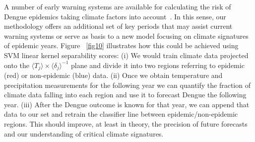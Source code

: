 \documentclass[final,leqno]{siamltexmm2}
\begin{document}
 


A number of early warning systems are available for calculating the risk of Dengue epidemics taking climate factors into 
account~\cite{Buczak2012,Buczak2014,Lowe2011,Lowe2012, Racloz2012, Johansson2016}. In this sense, our methodology offers an additional set of key periods
that may assist current warning systems or serve as basis to a new model focusing on climate signatures of epidemic years.  
Figure ~\ref{fig10} illustrates how this could be achieved using SVM linear kernel separability scores: (i) We would train climate 
data projected onto the $\langle T_j \rangle  \times  \langle \delta_j \rangle ^{-1}$ plane and divide it into two regions referring
to epidemic (red) or non-epidemic (blue) data. (ii) Once we obtain temperature and precipitation measurements for the following
year we can quantify the fraction of climate data falling into each region and use it to forecast Dengue the following year. 
(iii) After the Dengue outcome is known for that year, we can append that data to our set and retrain the classifier line between 
epidemic/non-epidemic regions. This should improve, at least in theory, the precision of future forecasts and our understanding 
of critical climate signatures. 
\end{document}
